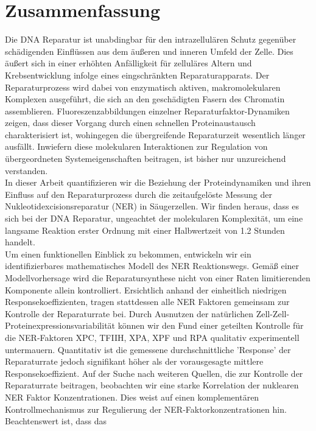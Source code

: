 \chapter*{Zusammenfassung}
\thispagestyle{plain2}


Die DNA Reparatur ist unabdingbar f\"{u}r den intrazellul\"{a}ren Schutz gegen\"{u}ber sch\"{a}digenden Einfl\"{u}ssen aus dem \"{a}u\ss{}eren und inneren Umfeld der Zelle. Dies \"{a}u\ss{}ert sich in einer erh\"{o}hten Anf\"{a}lligkeit f\"{u}r zellul\"{a}res Altern und Krebsentwicklung infolge eines eingschr\"{a}nkten Reparaturapparats. Der Reparaturprozess wird dabei von enzymatisch aktiven, makromolekularen Komplexen ausgef\"{u}hrt, die sich an den gesch\"{a}digten Fasern des Chromatin assemblieren. Fluoreszenzabbildungen einzelner Reparaturfaktor-Dynamiken zeigen, dass dieser Vorgang durch einen schnellen Proteinaustausch charakterisiert ist, wohingegen die \"{u}bergreifende Reparaturzeit wesentlich l\"{a}nger ausf\"{a}llt. Inwiefern diese molekularen Interaktionen zur Regulation von \"{u}bergeordneten Systemeigenschaften beitragen, ist bisher nur unzureichend verstanden.\\
In dieser Arbeit quantifizieren wir die Beziehung der Proteindynamiken und ihren Einfluss auf den Reparaturprozess durch die zeitaufgel\"{o}ste Messung der Nukleotidexcisionsreparatur (NER) in S\"{a}ugerzellen. Wir finden heraus, dass es sich bei der DNA Reparatur, ungeachtet der molekularen Komplexit\"{a}t, um eine langsame Reaktion erster Ordnung mit einer Halbwertzeit von 1.2 Stunden handelt.\\  
Um einen funktionellen Einblick zu bekommen, entwickeln wir ein identifizierbares mathematisches Modell des NER Reaktionswegs. Gem\"{a}\ss{} einer Modellvorhersage wird die Reparatursynthese nicht von einer Raten limitierenden Komponente allein kontrolliert. Ersichtlich anhand der einheitlich niedrigen Responsekoeffizienten, tragen stattdessen alle NER Faktoren gemeinsam zur Kontrolle der Reparaturrate bei. Durch Ausnutzen der nat\"{u}rlichen Zell-Zell-Proteinexpressionsvariabilit\"{a}t k\"{o}nnen wir den Fund einer geteilten Kontrolle f\"{u}r die NER-Faktoren XPC, TFIIH, XPA, XPF und RPA qualitativ experimentell untermauern. Quantitativ ist die gemessene durchschnittliche 'Response' der Reparaturrate jedoch signifikant h\"{o}her als der vorausgesagte mittlere Responsekoeffizient. Auf der Suche nach weiteren Quellen, die zur Kontrolle der Reparaturrate beitragen, beobachten wir eine starke Korrelation der nuklearen NER Faktor Konzentrationen. Dies weist auf einen komplement\"{a}ren Kontrollmechanismus zur Regulierung der NER-Faktorkonzentrationen hin. Beachtenswert ist, dass das             



